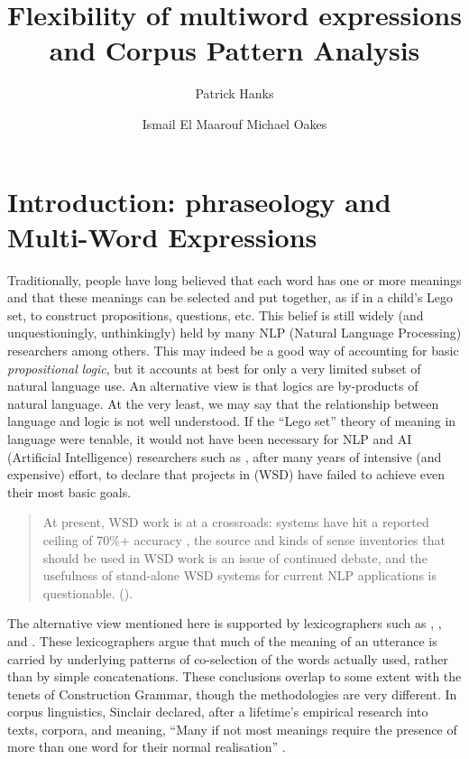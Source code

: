 \documentclass[output=paper]{langsci/langscibook}
\author{Patrick Hanks\affiliation{RIILP, University of Wolverhampton, England}%
\and Ismail El Maarouf\affiliation{Adarga Ltd., England}%
\lastand Michael Oakes\affiliation{RIILP, University of Wolverhampton, England}}
\title{Flexibility of multiword expressions and Corpus Pattern Analysis}
\begin{document}
\section{Introduction: phraseology and Multi-Word Expressions}

Traditionally, people have long believed that each word has one or more
meanings and that these meanings can be selected and put together, as
if in a child’s Lego set, to construct propositions, questions, etc.
This belief is still widely (and unquestioningly, unthinkingly) held by
many NLP (Natural Language Processing) researchers among others. This
may indeed be a good way of accounting for basic
\textit{propositional}
\textit{logic}, but it accounts at best for only a
very limited subset of natural language use. An alternative view is
that logics are by-products of natural language. At the very least, we
may say that the relationship between language and logic is not well
understood. If the “Lego set” theory of meaning in language were
tenable, it would not have been necessary for NLP and AI (Artificial
Intelligence) researchers such as \cite{ide2006}, after many
years of intensive (and expensive) effort, to declare that projects in
 (WSD) have failed to achieve even their most
basic goals.


\begin{quotation}
At present, WSD work is at a crossroads: systems have hit a reported
ceiling of 70\%+ accuracy \citep{article}, the source and
kinds of sense inventories that should be used in WSD work is an issue
of continued debate, and the usefulness of stand-alone WSD systems for
current NLP applications is questionable. (\citealt[15]{ide2006}).
\end{quotation}


The alternative view mentioned here is supported by lexicographers such
as \cite{Atkins:2001}, \cite{article},  and \cite{hanks2000}.
These lexicographers argue that much of the meaning of an utterance is
carried by underlying patterns of co-selection of the words actually
used, rather than by simple concatenations. These conclusions overlap
to some extent with the tenets of  Construction Grammar, though the
methodologies are very different. In corpus linguistics, Sinclair
declared, after a lifetime’s empirical research into texts, corpora,
and meaning, “Many if not most meanings require the presence of more
than one word for their normal realisation” \citep[4]{sinclair1998}.
\end{document}
